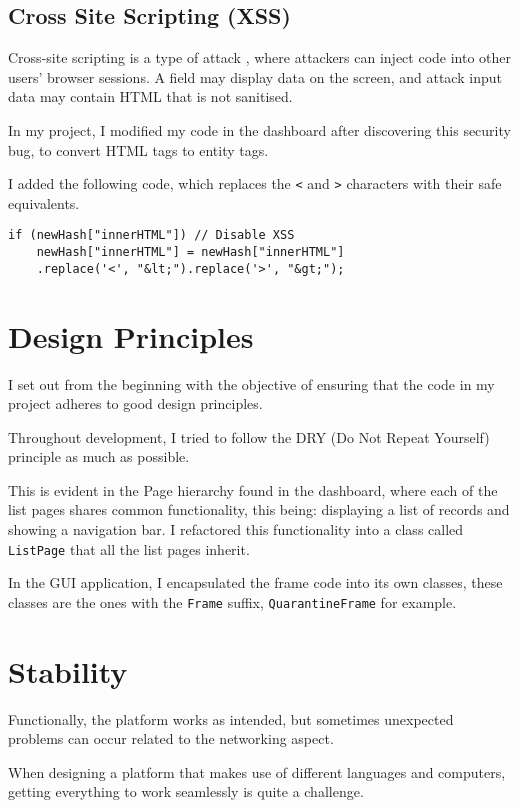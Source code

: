 \subsection{Cross Site Scripting (XSS)}
Cross-site scripting is a type of attack \cite{XSS},
where attackers can inject code into other users' browser sessions.
A field may display data on the screen,
and attack input data may contain HTML
that is not sanitised.

In my project, I modified my code in the dashboard
after discovering this security bug,
to convert HTML tags to entity tags.

I added the following code, which replaces the \texttt{<}
and \texttt{>} characters with their safe equivalents.

\begin{lstlisting}
if (newHash["innerHTML"]) // Disable XSS
    newHash["innerHTML"] = newHash["innerHTML"]
    .replace('<', "&lt;").replace('>', "&gt;");
\end{lstlisting}

\section{Design Principles}
I set out from the beginning with the objective of
ensuring that the code in my project adheres to good design principles.

Throughout development, I tried to follow the
DRY (Do Not Repeat Yourself) principle as much as possible.

This is evident in the Page hierarchy found in the dashboard,
where each of the list pages shares common functionality,
this being: displaying a list of records and showing a navigation bar.
I refactored this functionality into a class called \texttt{ListPage}
that all the list pages inherit.

In the GUI application, I encapsulated the frame code into its own classes,
these classes are the ones with the \texttt{Frame} suffix,
\texttt{QuarantineFrame} for example.

\section{Stability}
Functionally, the platform works as intended,
but sometimes unexpected problems can occur
related to the networking aspect.

When designing a platform that makes use of
different languages and computers, getting everything
to work seamlessly is quite a challenge.

